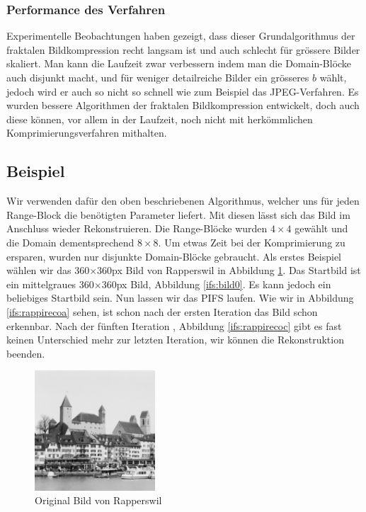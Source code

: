 \subsubsection{Performance des Verfahren}
Experimentelle Beobachtungen haben gezeigt, dass dieser Grundalgorithmus der fraktalen Bildkompression recht langsam ist und auch schlecht für grössere Bilder skaliert.
Man kann die Laufzeit zwar verbessern indem man die Domain-Blöcke auch disjunkt macht, und für weniger detailreiche Bilder ein grösseres $b$ wählt, jedoch wird er auch so nicht so schnell wie zum Beispiel das JPEG-Verfahren.
Es wurden bessere Algorithmen der fraktalen Bildkompression entwickelt, doch auch diese können, vor allem in der Laufzeit, noch nicht mit herkömmlichen Komprimierungsverfahren mithalten.

\subsection{Beispiel}
Wir verwenden dafür den oben beschriebenen Algorithmus, welcher uns für jeden Range-Block die benötigten Parameter liefert.
Mit diesen lässt sich das Bild im Anschluss wieder Rekonstruieren.
Die Range-Blöcke wurden $4\times4$ gewählt und die Domain dementsprechend $8\times8$.
Um etwas Zeit bei der Komprimierung zu ersparen, wurden nur disjunkte Domain-Blöcke gebraucht.
Als erstes Beispiel wählen wir das 360$\times$360px Bild von Rapperswil in Abbildung \ref{ifs:original}.
Das Startbild ist ein mittelgraues 360$\times$360px Bild, Abbildung \ref{ifs:bild0}.
Es kann jedoch ein beliebiges Startbild sein.
Nun lassen wir das PIFS laufen.
Wie wir in Abbildung \ref{ifs:rappirecoa} sehen, ist schon nach der ersten Iteration das Bild schon erkennbar.
Nach der fünften Iteration , Abbildung \ref{ifs:rappirecoc} gibt es fast keinen Unterschied mehr zur letzten Iteration, wir können die Rekonstruktion beenden.
\begin{figure}	
	\centering
	\includegraphics[width=0.4\textwidth]{papers/ifs/images/original}
	\caption{Original Bild von Rapperswil}
	\label{ifs:original}
\end{figure}
